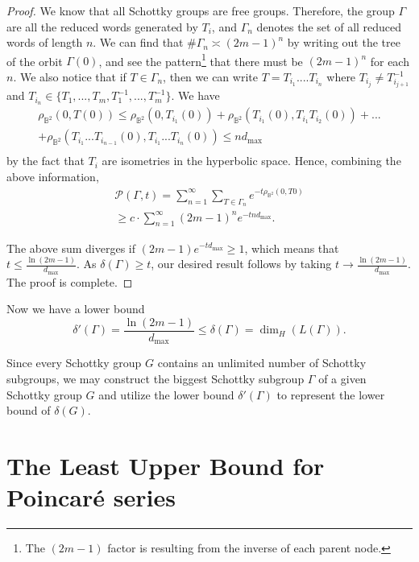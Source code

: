 \documentclass[12pt,oneside]{sfsuthesis}
\theoremstyle{plain} %
\theoremstyle{definition}  %
\theoremstyle{remark}  %
\theoremstyle{plain}
\begin{document}
{\begin{proof}
We know that all Schottky groups are free groups. Therefore, the group $\Gamma$ are all the reduced words generated by $T_i$, and $\Gamma_n$ denotes the set of all reduced words of length $n$. We can find that $\#\Gamma_n\asymp (2m-1)^n$ by writing out the tree of the orbit $\Gamma(0)$, and see the pattern\footnote{The $(2m-1)$ factor is resulting from the inverse of each parent node.} that there must be $(2m-1)^n$ for each $n$. We also notice that if $T\in \Gamma_n$, then we can write $T = T_{i_1}....T_{i_n}$ where $T_{i_j}\ne T_{i_{j+1}}^{-1}$ and $T_{i_n}\in \{T_1,...,T_m, T_1^{-1},...,T_m^{-1}\}$. We have 
\begin{equation}
\begin{array}{c}
\rho_{\mathbb{B}^2}(0,T(0)) \leq  \rho_{\mathbb{B}^2}(0,T_{i_1}(0))+
 \rho_{\mathbb{B}^2}(T_{i_1}(0), T_{i_1}T_{i_2}(0))+...\\+\rho_{\mathbb{B}^2}(T_{i_1}...T_{i_{n-1}}(0), T_{i_1}...T_{i_n}(0))   \le  n d_{\max}\\
\end{array}
\end{equation}
by the fact that $T_i$ are isometries in the hyperbolic space.  Hence, combining the above information, 
\begin{equation}
\begin{array}{c}
\mathcal{P}(\Gamma,  t) = \sum\limits_{n=1}^{\infty}\sum\limits_{T\in \Gamma_n} e^{-t \rho_{\mathbb{B}^2}(0,T0)}\\
\ge  c\cdot   \sum\limits_{n=1}^{\infty}  (2m-1)^n e^{-tn d_{\max}}. 
\end{array}
\end{equation}

The above sum diverges if $(2m-1)e^{-td_{\max}}\ge 1$, which means that $t \le \frac{\ln (2m-1)}{d_{\max}}$. As $\delta(\Gamma) \ge t$, our desired result follows by taking $t\to \frac{\ln (2m-1)}{d_{\max}}$. The proof is complete. 
\end{proof}


Now we have a lower bound $$\delta'(\Gamma)=\frac{\ln (2m-1)}{d_{\max}}\leq \delta(\Gamma)=\dim_{H}(L(\Gamma)).$$

Since every Schottky group $G$ contains an unlimited number of Schottky subgroups, we may construct the biggest Schottky subgroup $\Gamma$ of a given Schottky group $G$ and utilize the lower bound $\delta'(\Gamma)$ to represent the lower bound of $\delta(G)$.


\section{The Least Upper Bound for Poincar\'{e} series}

}
\end{document}

